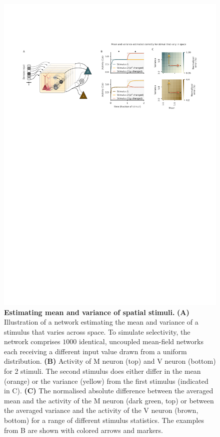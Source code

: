 \documentclass[10pt,a4paper,draft]{article}
\begin{document}
\begin{figure}[!h]
	\centering
    \includegraphics[width=1\linewidth]{../results/figures/final/Fig_2_S3.pdf}%
\caption{\footnotesize{\bf Estimating mean and variance of spatial stimuli.\newline}  
{\bf (A)} Illustration of a network estimating the mean and variance of a stimulus that varies across space. To simulate selectivity, the network comprises $1000$ identical, uncoupled mean-field networks each receiving a different input value drawn from a uniform distribution. 
{\bf (B)} Activity of M neuron (top) and V neuron (bottom) for 2 stimuli. The second stimulus does either differ in the mean (orange) or the variance (yellow) from the first stimulus (indicated in C).
{\bf (C)} The normalised absolute difference between the averaged mean and the activity of the M neuron (dark green, top) or between the averaged variance and the activity of the V neuron (brown, bottom) for a range of different stimulus statistics. The examples from B are shown with colored arrows and markers.
}
\label{fig:Fig_2_S3}
\end{figure}
\end{document}
